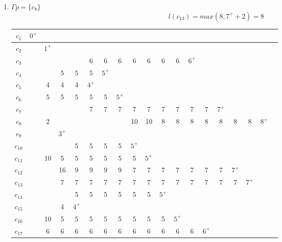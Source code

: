 \documentclass[12pt, a4paper] {ncc}
\begin{document}
\begin{enumerate}
	\item $\Gamma p = \{ c_8\}$
	$$l(c_{13}) = max(8, 7^+ + 2) = 8 $$
\begin{tabular} {|c|c|c|c|c|c|c|c|c|c|c|c|c|c|c|c|c|c|c|}
    \hline
    $c_{1}$  &$0^+$&      &     &     &     &     &     &      &     &     &     &     &     &      &     &    & \\ \hline
    $c_{2}$  & \z  &$1^+$ &     &     &     &     &     &      &     &     &     &     &     &      &     &    & \\ \hline
    $c_{3}$  & \z  & \z   & \z  &\z   & 6   &  6  &  6  &  6   & 6   & 6   & 6   &$6^+$&     &      &     &    & \\ \hline
    $c_{4}$  & \z  & \z   & 5   & 5   & 5   &$5^+$&     &      &     &     &     &     &     &      &     &    & \\ \hline
    $c_{5}$  & \z  & 4    & 4   & 4   &$4^+$&     &     &      &     &     &     &     &     &      &     &    & \\ \hline
    $c_{6}$  & \z  & 5    & 5   & 5   & 5   &  5  &$5^+$&      &     &     &     &     &     &      &     &    & \\ \hline
    $c_{7}$  & \z  & \z   & \z  & \z  & 7   &  7  &  7  &  7   & 7   & 7   & 7   &7    & 7   & $7^+$&     &       & \\ \hline
    $c_{8}$  & \z  & 2    & \z  & \z  & \z  &  \z & \z  &  10  & 10  & 8   & 8   &8    & 8   &  8   & 8   & 8  & $8^+$\\ \hline
    $c_{9}$  & \z  & \z   &$3^+$&     &     &     &     &      &     &     &     &     &     &      &     &    & \\ \hline
    $c_{10}$ & \z  & \z   & \z  & 5   & 5   &  5  &  5  &$5^+$ &     &     &     &     &     &      &     &    & \\ \hline
    $c_{11}$ & \z  & 10   &  5  & 5   & 5   &  5  &  5  &  5   &$5^+$&     &     &     &     &      &     &    & \\ \hline
    $c_{12}$ & \z  & \z   & 16  & 9   & 9   &  9  &  9  &  7   & 7   & 7   & 7   & 7   & 7   &  7   &$7^+$&        & \\ \hline
    $c_{13}$ & \z  & \z   & 7   & 7   & 7   &  7  &  7  &  7   & 7   & 7   & 7   & 7   & 7   &  7   & 7   &$7^+$   & \\ \hline
    $c_{14}$ & \z  & \z   & \z  & 5   & 5   &  5  &  5  &  5   & 5   &$5^+$&     &     &     &      &     &    & \\ \hline
    $c_{15}$ & \z  & \z   & 4   &$4^+$&     &     &     &      &     &     &     &     &     &      &     &    & \\ \hline
    $c_{16}$ & \z  & 10   & 5   & 5   & 5   &  5  &  5  &  5   & 5   & 5   &$5^+$&     &     &      &     &    & \\ \hline
    $c_{17}$ & \z  & 6    & 6   & 6   & 6   &  6  &  6  &  6   & 6   & 6   & 6   & 6   &$6^+$&      &     &   & \\ \hline 
\end{tabular}

\end{enumerate}
\end{document}
